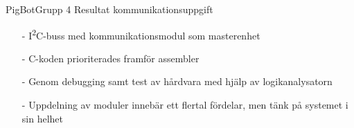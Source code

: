 
\begin{frame}[fragile]{PigBot}{Grupp 4}
Resultat kommunikationsuppgift
\pause
\begin{itemize}
	\item[-] I\textsuperscript{2}C-buss med kommunikationsmodul som masterenhet
	\item[-] C-koden prioriterades framför assembler
	\item[-] Genom debugging samt test av hårdvara med hjälp av logikanalysatorn
	\item[-] Uppdelning av moduler innebär ett flertal fördelar, men tänk på systemet i sin helhet
\end{itemize}
\end{frame}


